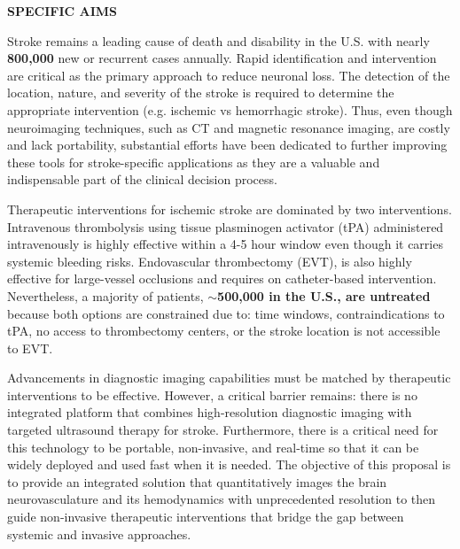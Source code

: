 \documentclass[fleqn,11pt,letterpaper]{article}
\begin{document}
\newcommand{\exvivo}{\textit{ex vivo}}
\newcommand{\invivo}{\textit{in vivo}}
\newcommand{\invitro}{\textit{in vitro}}
\newcommand{\degrees}{\ensuremath{^\circ}C}
\newcommand{\degree}{\ensuremath{^\circ}}
\renewcommand{\em}{\itshape}
\renewcommand{\emph}{\textit}
\renewcommand{\thesection}{\Alph{section}}


\begin{center}
\textbf{SPECIFIC AIMS}
\end{center}

Stroke remains a leading cause of death and disability in the U.S. with nearly \textbf{800,000} new or recurrent cases annually. Rapid identification and intervention are critical as the primary approach to reduce neuronal loss. The detection of the location, nature, and severity of the stroke is required to determine the appropriate intervention (e.g. ischemic vs hemorrhagic stroke). Thus, even though neuroimaging techniques, such as CT and magnetic resonance imaging, are costly and lack portability, substantial efforts have been dedicated to further improving these tools for stroke-specific applications as they are a valuable and indispensable part of the clinical decision process.

Therapeutic interventions for ischemic stroke are dominated by two interventions. Intravenous thrombolysis using tissue plasminogen activator (tPA)  administered intravenously is highly effective within a 4-5 hour window even though it carries systemic bleeding risks.  Endovascular thrombectomy (EVT), is also highly effective for large-vessel occlusions and requires on catheter-based intervention. Nevertheless, a majority of patients, $\sim$\textbf{500,000 in the U.S., are untreated} because both options are constrained due to: time windows, contraindications to tPA, no access to thrombectomy centers, or the stroke location is not accessible to EVT.

Advancements in diagnostic imaging capabilities must be matched by therapeutic interventions to be effective. However, a critical barrier remains: there is no integrated platform that combines high-resolution diagnostic imaging with targeted ultrasound therapy for stroke. Furthermore, there is a critical need for this technology to be portable, non-invasive, and real-time  so that it can be widely deployed and used fast when it is needed. The objective of this proposal is to provide an integrated solution that quantitatively images the brain neurovasculature and its hemodynamics with unprecedented resolution to then guide non-invasive therapeutic interventions that bridge the gap between systemic and invasive approaches.
\end{document}
